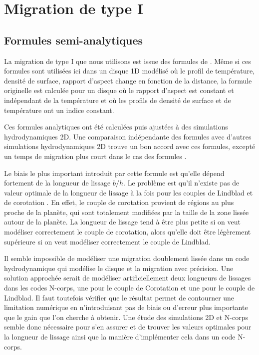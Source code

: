 \section{Migration de type I}
\subsection{Formules semi-analytiques}
La migration de type I que nous utilisons est issue des formules de \cite{paardekooper2011torque}. Même si ces formules sont utilisées ici dans un disque 1D modélisé où le profil de température, densité de surface, rapport d'aspect change en fonction de la distance, la formule originelle est calculée pour un disque où le rapport d'aspect est constant et indépendant de la température et où les profils de densité de surface et de température ont un indice constant. 

Ces formules analytiques ont été calculées puis ajustées à des simulations hydrodynamiques 2D. Une comparaison indépendante des formules avec d'autres simulations hydrodynamiques 2D trouve un bon accord avec ces formules, excepté un temps de migration plus court dans le cas des formules \citep{pierens2013makingaccepted}. 

Le biais le plus important introduit par cette formule est qu'elle dépend fortement de la longueur de lissage $b/h$. Le problème est qu'il n'existe pas de valeur optimale de la longueur de lissage à la fois pour les couples de Lindblad et de corotation \citep{masset2002coorbital}. En effet, le couple de corotation provient de régions au plus proche de la planète, qui sont totalement modifiées par la taille de la zone lissée autour de la planète. La longueur de lissage tend à être plus petite si on veut modéliser correctement le couple de corotation, alors qu'elle doit être légèrement supérieure si on veut modéliser correctement le couple de Lindblad. 

Il semble impossible de modéliser une migration doublement lissée dans un code hydrodynamique qui modélise le disque et la migration avec précision. Une solution approchée serait de modéliser artificiellement deux longueurs de lissages dans les codes N-corps, une pour le couple de Corotation et une pour le couple de Lindblad. Il faut toutefois vérifier que le résultat permet de contourner une limitation numérique en n'introduisant pas de biais ou d'erreur plus importante que le gain que l'on cherche à obtenir. Une étude des simulations 2D et N-corps semble donc nécessaire pour s'en assurer et de trouver les valeurs optimales pour la longueur de lissage ainsi que la manière d'implémenter cela dans un code N-corps. 

